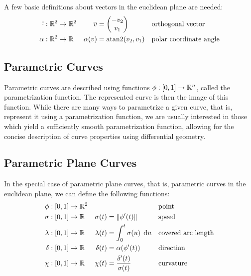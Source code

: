 \documentclass[a4paper]{article}
\begin{document}
			A few basic definitions about vectors in the euclidean plane are needed:
			\begin{align*}
				\overline{\cdot} & : \function{\R{2}}{\R{2}} & \overline{v}      & = \vectorB{-v_2}{v_1}      && \text{orthogonal vector}\\
				\alpha           & : \function{\R{2}}{\RR}   & \apply{\alpha}{v} & = \apply{\atan2}{v_2, v_1} && \text{polar coordinate angle}
			\end{align*}

		\subsection{Parametric Curves}
		\label{section:parametric_curves}

			Parametric curves are described using functions \(\phi : \left[ 0,1 \right] \rightarrow \mathbb{R}^{n}\), called the parametrization function. The represented curve is then the image of this function. While there are many ways to parametrize a given curve, that is, represent it using a parametrization function, we are usually interested in those which yield a sufficiently smooth parametrization function, allowing for the concise description of curve properties using differential geometry.

		\subsection{Parametric Plane Curves}
		\label{section:parametric_plane_curves}

			In the special case of parametric plane curves, that is, parametric curves in the euclidean plane, we can define the following functions:
			\begin{align*}
				\phi    & : \function{\unit}{\R{2}} &                    &                                                && \text{point}\\
				\sigma  & : \function{\unit}{\RR}   & \apply{\sigma}{t}  & = \xn{\apply{\phi'}{t}}                        && \text{speed}\\
				\lambda & : \function{\unit}{\RR}   & \apply{\lambda}{t} & = \integral{0}{t}{\apply{\sigma}{u}}{u}        && \text{covered arc length}\\
				\delta  & : \function{\unit}{\RR}   & \apply{\delta}{t}  & = \apply{\alpha}{\apply{\phi'}{t}}             && \text{direction}\\
				\chi    & : \function{\unit}{\RR}   & \apply{\chi}{t}    & = \frac{\apply{\delta'}{t}}{\apply{\sigma}{t}} && \text{curvature}
			\end{align*}
\end{document}
